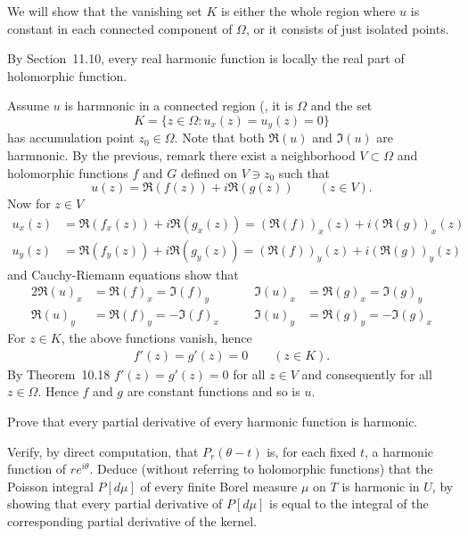 \begin{enumerate}
We will show that
the vanishing set $K$ is either the whole region where $u$ is constant
in each connected component of \(\Omega\),
or it consists of just isolated points.

By Section~11.10, every real harmonic function is locally the real part
of holomorphic function.

Assume $u$ is harmnonic in a connected region
(\wlogy, it is \(\Omega\) and the set
\begin{equation*}
 K = \{z\in\Omega: u_x(z) = u_y(z) = 0\}
\end{equation*}
has accumulation point \(z_0 \in \Omega\).
Note that both \(\Re(u)\) and \(\Im(u)\) are harmnonic.
By the previous, remark there exist a neighborhood \(V\subset\Omega\)
and holomorphic functions $f$ and $G$ defined on $V\ni z_0$ such that
\begin{equation*}
 u(z) = \Re(f(z)) + i\Re(g(z)) \qquad (z\in V).
\end{equation*}
Now for \(z\in V\)
\begin{align*}
u_x(z) &= \Re(f_x(z)) + i\Re(g_x(z)) = (\Re(f))_x(z) + i(\Re(g))_x(z) \\
u_y(z) &= \Re(f_y(z)) + i\Re(g_y(z)) = (\Re(f))_y(z) + i(\Re(g))_y(z)
\end{align*}
and Cauchy-Riemann equations show that 
\begin{alignat*}{2}
\Re(u)_x &= \Re(f)_x = \Im(f)_y &\qquad \Im(u)_x &= \Re(g)_x = \Im(g)_y \\
\Re(u)_y &= \Re(f)_y = -\Im(f)_x &\qquad \Im(u)_y &= \Re(g)_y = -\Im(g)_x 
\end{alignat*}
For \(z\in K\), the above functions vanish, hence
\begin{align*}
f'(z) = g'(z) = 0 \qquad (z\in K).
\end{align*}
By Theorem~10.18 \(f'(z)=g'(z) = 0\) for all \(z\in V\)
and consequently for all \(z\in \Omega\).
Hence $f$ and $g$ are constant functions and so is $u$.

\begin{excopy}
Prove that every partial derivative of every harmonic function is harmonic.

Verify, by direct computation, that \(P_r(\theta - t)\) is, for each fixed $t$,
a harmonic function of \(re^{i\theta}\).
Deduce (without referring to holomorphic functions) that the Poisson integral
\(P[d\mu]\) of every finite
Borel measure \(\mu\) on $T$ is harmonic in $U$, by showing that every partial
derivative of \(P[d\mu]\) is equal to
the integral of the corresponding partial derivative of the kernel.
\end{excopy}


\end{enumerate}
